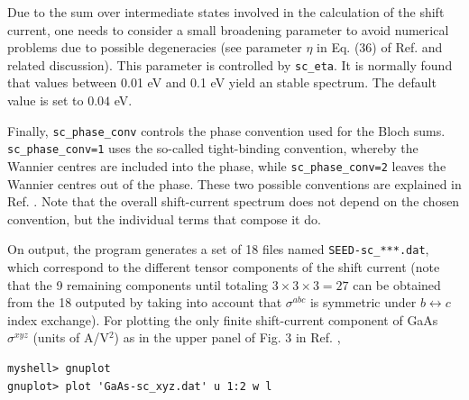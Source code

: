 \documentclass[a4paper,11pt,twoside]{article}
\begin{document}
Due to the sum over intermediate states involved in the calculation of the shift current, 
one needs to consider a small broadening parameter to avoid numerical problems due to possible degeneracies
(see parameter $\eta$ in Eq. (36) of Ref. \cite{ibanez-azpiroz_ab_2018} and related discussion).
This parameter is controlled by \verb|sc_eta|. It is normally found that values between 0.01 eV and 0.1 eV 
yield an stable spectrum. The default value is set to  $0.04$ eV.

Finally, \verb|sc_phase_conv| controls the phase convention used for the Bloch sums. 
\verb|sc_phase_conv=1| uses the so-called tight-binding convention, whereby the Wannier centres are included
into the phase, while   \verb|sc_phase_conv=2| leaves the Wannier centres out of the phase.
These two possible conventions are explained in Ref. \cite{pythtb}. 
Note that the overall shift-current spectrum does not depend on the chosen convention,
but the individual terms that compose it do.


On output, the program generates a set of 18 files named \verb|SEED-sc_***.dat|, 
which correspond to the different tensor components  of the shift current
(note that the 9 remaining components until totaling $3\times3\times3=27$ 
can be obtained from the 18 outputed by taking into account that $\sigma^{abc}$ is 
symmetric under $b\leftrightarrow c$ index exchange).
For plotting the only finite shift-current component of GaAs $\sigma^{xyz}$ (units of A/V$^{2}$) as in the upper 
panel of Fig. 3 in Ref. \cite{ibanez-azpiroz_ab_2018},
\begin{verbatim}
myshell> gnuplot
gnuplot> plot 'GaAs-sc_xyz.dat' u 1:2 w l
\end{verbatim} 


\end{document}
